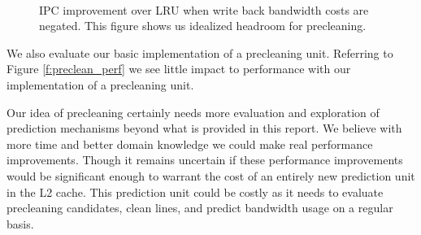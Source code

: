 \begin{figure}[htb]
\begin{center}
\ 
\caption{IPC improvement over LRU when write back bandwidth costs are negated. This figure shows us idealized headroom for precleaning.}
\label{f:preclean_headroom}
\end{center}
\end{figure}

We also evaluate our basic implementation of a precleaning unit. Referring to Figure \ref{f:preclean_perf} we see little impact to performance with our implementation of a precleaning unit.

Our idea of precleaning certainly needs more evaluation and exploration of prediction mechanisms beyond what is provided in this report. We believe with more time and better domain knowledge we could make real performance improvements. Though it remains uncertain if these performance improvements would be significant enough to warrant the cost of an entirely new prediction unit in the L2 cache. This prediction unit could be costly as it needs to evaluate precleaning candidates, clean lines, and predict bandwidth usage on a regular basis.
